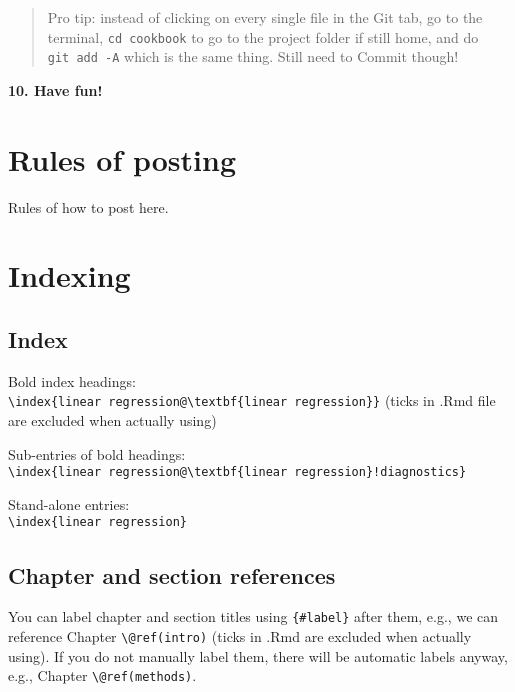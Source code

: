 \documentclass[]{book}
\theoremstyle{definition}
\theoremstyle{definition}
\theoremstyle{definition}
\theoremstyle{remark}
\begin{document}
\begin{quote}
Pro tip: instead of clicking on every single file in the Git tab, go to
the terminal, \texttt{cd\ cookbook} to go to the project folder if still
home, and do \texttt{git\ add\ -A} which is the same thing. Still need
to Commit though!
\end{quote}

\textbf{10. Have fun!}

\hypertarget{rules-of-posting}{%
\section{Rules of posting}\label{rules-of-posting}}

Rules of how to post here.

\hypertarget{indexing}{%
\section{Indexing}\label{indexing}}

\hypertarget{index}{%
\subsection{Index}\label{index}}

Bold index headings:\\
\texttt{\textbackslash{}index\{linear\ regression@\textbackslash{}textbf\{linear\ regression\}\}}
(ticks in .Rmd file are excluded when actually using)

Sub-entries of bold headings:\\
\texttt{\textbackslash{}index\{linear\ regression@\textbackslash{}textbf\{linear\ regression\}!diagnostics\}}

Stand-alone entries:\\
\texttt{\textbackslash{}index\{linear\ regression\}}

\hypertarget{chapter-and-section-references}{%
\subsection{Chapter and section
references}\label{chapter-and-section-references}}

You can label chapter and section titles using \texttt{\{\#label\}}
after them, e.g., we can reference Chapter
\texttt{\textbackslash{}@ref(intro)} (ticks in .Rmd are excluded when
actually using). If you do not manually label them, there will be
automatic labels anyway, e.g., Chapter
\texttt{\textbackslash{}@ref(methods)}.
\end{document}
